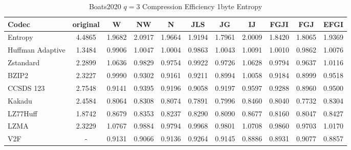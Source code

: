 \documentclass{article}
\begin{document}
\begin{table}[h!]
\centering
\caption{Boats2020 $q=3$ Compression Efficiency 1byte Entropy}
\begin{tabular}{|l|cccccccccc|}
\hline
Codec &  original &      W &     NW &      N &    JLS &     JG &     IJ &   FGJI &    FGJ &   EFGI \\
\hline
Entropy & 4.4865 & 1.9682 & 2.0917 & 1.9664 & 1.9194 & 1.7961 & 2.0009 & 1.8420 & 1.8065 & 1.9369 \\
\hline
Huffman Adaptive &    1.3484 & 0.9906 & 1.0047 & 1.0004 & 0.9863 & 1.0043 & 1.0091 & 1.0010 & 0.9862 & 1.0076 \\
Zstandard        &    2.2899 & 1.0636 & 0.9829 & 0.9754 & 0.9922 & 0.9726 & 1.0628 & 0.9794 & 0.9637 & 1.0116 \\
BZIP2            &    2.3227 & 0.9990 & 0.9302 & 0.9161 & 0.9211 & 0.8994 & 1.0058 & 0.9184 & 0.8999 & 0.9518 \\
CCSDS 123        &    2.7548 & 0.9141 & 0.9395 & 0.9196 & 0.9058 & 0.9197 & 0.9597 & 0.9288 & 0.8960 & 0.9500 \\
Kakadu           &    2.4584 & 0.8064 & 0.8308 & 0.8074 & 0.7891 & 0.7996 & 0.8460 & 0.8040 & 0.7732 & 0.8304 \\
LZ77Huff         &    1.8742 & 0.8679 & 0.8353 & 0.8237 & 0.8290 & 0.8090 & 0.8677 & 0.8160 & 0.8047 & 0.8427 \\
LZMA             &    2.3229 & 1.0767 & 0.9884 & 0.9794 & 0.9968 & 0.9801 & 1.0708 & 0.9860 & 0.9703 & 1.0170 \\
V2F              &    - & 0.9131 & 0.9066 & 0.9136 & 0.9264 & 0.9145 & 0.8886 & 0.8931 & 0.9077 & 0.8857 \\
\hline
\end{tabular}
\end{table}
\end{document}
